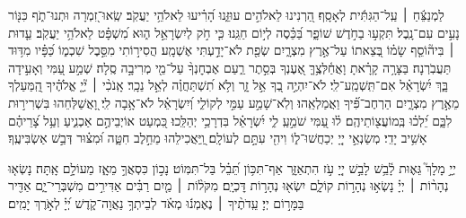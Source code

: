 \documentclass[twoside, openany, parskip=half, 11pt]{book}
\begin{document}
{
\begin{narrow}
%
לַמְנַצֵּ֬חַ ׀ עַֽל־הַגִּתִּ֬ית לְאָסָֽף׃
הַ֭רְנִינוּ לֵאלֹהִ֣ים עוּזֵּ֑נוּ הָ֝רִ֗יעוּ לֵאלֹהֵ֥י יַעֲקֹֽב׃
שְֽׂאוּ־זִ֭מְרָה וּתְנוּ־תֹ֑ף כִּנּ֖וֹר נָעִ֣ים עִם־נָֽבֶל׃
תִּקְע֣וּ בַחֹ֣דֶשׁ שׁוֹפָ֑ר בַּ֝כֵּ֗סֶה לְי֣וֹם חַגֵּֽנוּ׃
כִּ֤י חֹ֣ק לְיִשְׂרָאֵ֣ל ה֑וּא מִ֝שְׁפָּ֗ט לֵאלֹהֵ֥י יַעֲקֹֽב׃
עֵ֤דוּת ׀ בִּיה֘וֹסֵ֤ף שָׂמ֗וֹ בְּ֭צֵאתוֹ עַל־אֶ֣רֶץ מִצְרָ֑יִם שְׂפַ֖ת לֹא־יָדַ֣עְתִּי אֶשְׁמָֽע׃
הֲסִיר֣וֹתִי מִסֵּ֣בֶל שִׁכְמ֑וֹ כַּ֝פָּ֗יו מִדּ֥וּד תַּעֲבֹֽרְנָה׃
בַּצָּרָ֥ה קָרָ֗אתָ וָאֲחַ֫לְּצֶ֥ךָּ אֶ֭עֶנְךָ בְּסֵ֣תֶר רַ֑עַם אֶבְחׇנְךָ֨ עַל־מֵ֖י מְרִיבָ֣ה סֶֽלָה׃
שְׁמַ֣ע עַ֭מִּי וְאָעִ֣ידָה בָּ֑ךְ יִ֝שְׂרָאֵ֗ל אִם־תִּֽשְׁמַֽע־לִֽי׃
לֹא־יִהְיֶ֣ה בְ֭ךָ אֵ֣ל זָ֑ר וְלֹ֥א תִ֝שְׁתַּחֲוֶ֗ה לְאֵ֣ל נֵכָֽר׃
אָֽנֹכִ֨י ׀ יְ֘יָ֤ אֱלֹהֶ֗יךָ הַֽ֭מַּעַלְךָ מֵאֶ֣רֶץ מִצְרָ֑יִם הַרְחֶב־פִּ֗֝יךָ וַאֲמַלְאֵֽהוּ׃
וְלֹֽא־שָׁמַ֣ע עַמִּ֣י לְקוֹלִ֑י וְ֝יִשְׂרָאֵ֗ל לֹא־אָ֥בָה לִֽי׃
וָ֭אֲשַׁלְּחֵהוּ בִּשְׁרִיר֣וּת לִבָּ֑ם יֵ֝לְכ֗וּ בְּֽמוֹעֲצ֖וֹתֵיהֶֽם׃
ל֗וּ עַ֭מִּי שֹׁמֵ֣עַֽ לִ֑י יִ֝שְׂרָאֵ֗ל בִּדְרָכַ֥י יְהַלֵּֽכוּ׃
כִּ֭מְעַט אוֹיְבֵיהֶ֣ם אַכְנִ֑יעַ וְעַ֥ל צָ֝רֵיהֶ֗ם אָשִׁ֥יב יָדִֽי׃
מְשַׂנְאֵ֣י יְיָ֭ יְכַחֲשׁוּ־ל֑וֹ וִיהִ֖י עִתָּ֣ם לְעוֹלָֽם׃
וַֽ֭יַּאֲכִילֵהוּ מֵחֵ֣לֶב חִטָּ֑ה וּ֝מִצּ֗וּר דְּבַ֣שׁ אַשְׂבִּיעֶֽךָ׃
\end{narrow}

\begin{narrow}
%
יְיָ֣ מָלָךְ֮ גֵּא֢וּת לָ֫בֵ֥שׁ לָבֵ֣שׁ יְיָ֭ עֹ֣ז הִתְאַזָּ֑ר אַף־תִּכּ֥וֹן תֵּ֝בֵ֗ל בַּל־תִּמּֽוֹט׃
נָכ֣וֹן כִּסְאֲךָ֣ מֵאָ֑ז מֵעוֹלָ֣ם אָֽתָּה׃
נָשְׂא֤וּ נְהָר֨וֹת ׀ יְיָ֗ נָשְׂא֣וּ נְהָר֣וֹת קוֹלָ֑ם יִשְׂא֖וּ נְהָר֣וֹת דׇּכְיָֽם׃
מִקֹּל֨וֹת ׀ מַ֤יִם רַבִּ֗ים אַדִּירִ֣ים מִשְׁבְּרֵי־יָ֑ם אַדִּ֖יר בַּמָּר֣וֹם יְיָ׃
עֵֽדֹתֶ֨יךָ ׀ נֶאֶמְנ֬וּ מְאֹ֗ד לְבֵיתְךָ֥ נַאֲוָה־קֹ֑דֶשׁ יְ֝יָ֗ לְאֹ֣רֶךְ יָמִֽים׃
\end{narrow}
}

\weekdayshir
\end{document}
